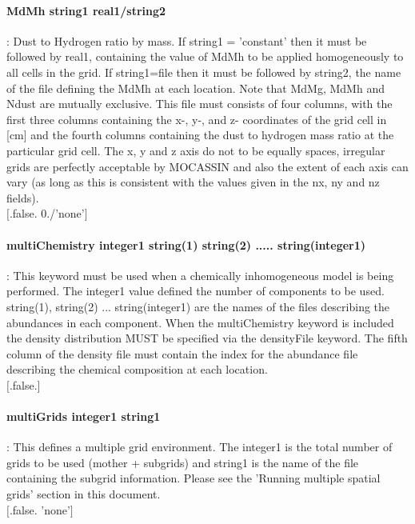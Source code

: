 \documentclass[11pt]{article}
\begin{document}
\paragraph    {MdMh string1 real1/string2} : Dust to Hydrogen ratio by mass. If string1 = 'constant' then
                     it must be followed by real1, containing the value of MdMh to be applied 
                     homogeneously to all cells in the grid. If string1=file then it must be 
                     followed by string2, the name of the file defining the MdMh at each 
                     location. Note that MdMg, MdMh and Ndust are mutually exclusive. 
                     This file must consists of four columns, with the first three 
		     columns containing the x-, y-, and z- coordinates of the grid cell in 
		     [cm] and the fourth columns containing the dust to hydrogen mass ratio
                     at the particular grid cell. The 
		     x, y and z axis do not to be equally spaces, irregular grids are 
		     perfectly acceptable by MOCASSIN and also the extent of each axis 
		     can vary (as long as this is consistent with the values given in 
		     the nx, ny and nz fields).\\
		     $[$.false. 0./'none'$]$\\

\paragraph    {multiChemistry integer1 string(1) string(2) ..... string(integer1)}: This keyword must
                     be used when a chemically inhomogeneous model is being performed. 
		     The integer1 value defined the number of components to be used. 
		     string(1), string(2) ... string(integer1) are the names of the 
		     files describing the abundances in each component. 
		     When the multiChemistry keyword is included the density distribution
		     MUST be specified via the densityFile keyword. The fifth column of the 
		     density file must contain the index for the abundance file describing 
		     the chemical composition at each location. \\
		     $[$.false.$]$\\

\paragraph    {multiGrids integer1 string1} : This defines a multiple grid environment. The integer1 is the 
                     total number of grids to be used (mother + subgrids) and string1 
                     is the name of the file containing the subgrid information. 
		     Please see the 'Running multiple spatial grids' section in this 
                     document.\\
                     $[$.false. 'none'$]$\\
                     	   
\end{document}
